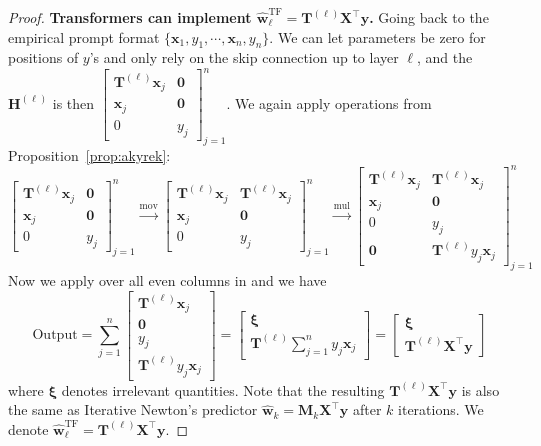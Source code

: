 \documentclass[11pt]{article}
\theoremstyle{plain}
\theoremstyle{definition}
\theoremstyle{remark}
\newcommand{\zero}{\boldsymbol{0}}
\renewcommand{\^}[1]{^{(#1)}}
\newcommand{\bx}{\boldsymbol{x}}
\newcommand{\bxi}{\boldsymbol{\xi}}
\newcommand{\bX}{\boldsymbol{X}}
\newcommand{\bM}{\boldsymbol{M}}
\newcommand{\by}{\boldsymbol{y}}
\newcommand{\bH}{\boldsymbol{H}}
\newcommand{\bT}{\boldsymbol{T}}
\newcommand{\bw}{\boldsymbol{w}}
\newcommand{\newton}{Iterative Newton}
\renewcommand{\paragraph}[1]{\vspace{1mm}\noindent\textbf{#1}}
\begin{document}
\begin{proof}
\paragraph{Transformers can implement $\hat{\bw}_\ell^\mathrm{TF} = \bT^{(\ell)} \bX^\top \by$.}
Going back to the empirical prompt format $\{\bx_1, y_1, \cdots, \bx_n, y_n\}$. We can let parameters be zero for positions of $y$'s and only rely on the skip connection up to layer $\ell$, and the $\bH^{(\ell)}$ is then $\begin{bmatrix}
           \bT^{(\ell)} \bx_j & \zero  \\
            \bx_j &  \zero \\
            0 & y_j
        \end{bmatrix}_{j=1}^n $. We again apply operations from Proposition~\ref{prop:akyrek}:
\begin{equation}
    \begin{bmatrix}
           \bT^{(\ell)} \bx_j & \zero  \\
            \bx_j &  \zero \\
            0 & y_j
        \end{bmatrix}_{j=1}^n \overset{\mathrm{mov}}{\longrightarrow} \begin{bmatrix}
           \bT^{(\ell)} \bx_j & \bT^{(\ell)} \bx_j  \\
            \bx_j & \zero \\
            0 & y_j
        \end{bmatrix}_{j=1}^n \overset{\mathrm{mul}}{\longrightarrow} \begin{bmatrix}
            \bT^{(\ell)} \bx_j & \bT^{(\ell)}\bx_j  \\
             \bx_j & \zero \\
             0 & y_j \\
        \zero & \bT^{(\ell)} y_j \bx_j 
        \end{bmatrix}_{j=1}^n 
\label{eqn:Tyjxj}
\end{equation}
Now we apply  over all even columns in  and we have 
\begin{equation}
    \mathrm{Output} = \sum_{j=1}^n \begin{bmatrix}
         \bT^{(\ell)}\bx_j \\ \zero \\ y_j \\  \bT^{(\ell)} y_j \bx_j 
    \end{bmatrix} = \begin{bmatrix}
        \bxi \\ \bT^{(\ell)} \sum_{j=1}^n y_j \bx_j 
    \end{bmatrix} = \begin{bmatrix}
        \bxi \\ \bT^{(\ell)} \bX^\top \by 
    \end{bmatrix}
\end{equation}
where $\bxi$ denotes irrelevant quantities. Note that the resulting $\bT^{(\ell)} \bX^\top \by $ is also the same as \newton's predictor $\hat{\bw}_k = \bM_k \bX^\top \by$ after $k$ iterations. We denote $\hat{\bw}_\ell^\mathrm{TF} = \bT^{(\ell)} \bX^\top \by$.


\end{proof}
\end{document}
